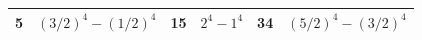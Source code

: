 \documentclass[a4paper,12pt,english,reqno]{amsart}
\begin{document}
\begin{table}
\begin{center}
\begin{tabular}{|c|c||c|c||c|c|}
5 & $(3/2)^4 -(1/2)^4$ & 15 & $2^4-  1^4$ & 34 & $(5/2)^4-(3/2)^4$ \\\hline

\end{tabular}
\end{center}
\end{table}
\end{document}
